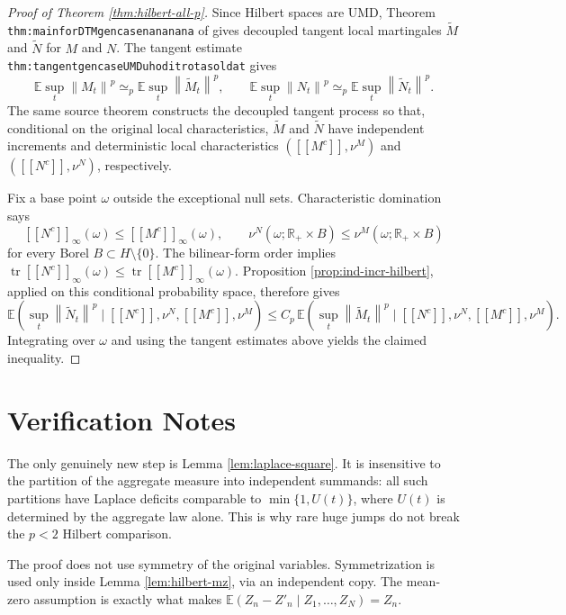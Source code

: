 \documentclass[11pt]{article}
\newcommand{\E}{\mathbb E}
\newcommand{\norm}[1]{\left\lVert #1\right\rVert}
\newcommand{\simequiv}{\simeq}
\begin{document}
\begin{proof}[Proof of Theorem \ref{thm:hilbert-all-p}]
Since Hilbert spaces are UMD, Theorem
\texttt{thm:mainforDTMgencasenananana} of \cite{Yaroslavtsev2019} gives
decoupled tangent local martingales \(\widetilde M\) and \(\widetilde N\) for
\(M\) and \(N\).  The tangent estimate
\texttt{thm:tangentgencaseUMDuhoditrotasoldat} gives
\[
  \E\sup_t\norm{M_t}^p\simequiv_p
  \E\sup_t\norm{\widetilde M_t}^p,
  \qquad
  \E\sup_t\norm{N_t}^p\simequiv_p
  \E\sup_t\norm{\widetilde N_t}^p .
\]
The same source theorem constructs the decoupled tangent process so that,
conditional on the original local characteristics, \(\widetilde M\) and
\(\widetilde N\) have independent increments and deterministic local
characteristics \(([\![M^c]\!],\nu^M)\) and
\(([\![N^c]\!],\nu^N)\), respectively.

Fix a base point \(\omega\) outside the exceptional null sets.  Characteristic
domination says
\[
   [\![N^c]\!]_\infty(\omega)\leq[\![M^c]\!]_\infty(\omega),
   \qquad
   \nu^N(\omega;\mathbb R_+\times B)
   \leq
   \nu^M(\omega;\mathbb R_+\times B)
\]
for every Borel \(B\subset H\setminus\{0\}\).  The bilinear-form order implies
\(\operatorname{tr}[\![N^c]\!]_\infty(\omega)\leq
\operatorname{tr}[\![M^c]\!]_\infty(\omega)\).  Proposition
\ref{prop:ind-incr-hilbert}, applied on this conditional probability space,
therefore gives
\[
   \E\!\left(\sup_t\norm{\widetilde N_t}^p\mid
      [\![N^c]\!],\nu^N,[\![M^c]\!],\nu^M\right)
   \leq
   C_p\,
   \E\!\left(\sup_t\norm{\widetilde M_t}^p\mid
      [\![N^c]\!],\nu^N,[\![M^c]\!],\nu^M\right).
\]
Integrating over \(\omega\) and using the tangent estimates above yields the
claimed inequality.
\end{proof}

\section*{Verification Notes}

The only genuinely new step is Lemma \ref{lem:laplace-square}.  It is
insensitive to the partition of the aggregate measure into independent
summands: all such partitions have Laplace deficits comparable to
\(\min\{1,U(t)\}\), where \(U(t)\) is determined by the aggregate law alone.
This is why rare huge jumps do not break the \(p<2\) Hilbert comparison.

The proof does not use symmetry of the original variables.  Symmetrization is
used only inside Lemma \ref{lem:hilbert-mz}, via an independent copy.  The
mean-zero assumption is exactly what makes
\(\E(Z_n-Z'_n\mid Z_1,\ldots,Z_N)=Z_n\).
\end{document}
